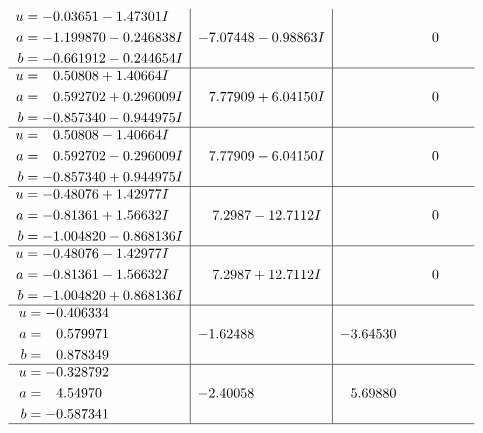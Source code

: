 \documentclass[1p]{elsarticle_modified}
\theoremstyle{definition}
\begin{document}
$$\begin{array}{c|c|c}
\begin{aligned}
u &= -0.03651 - 1.47301 I \\
a &= -1.199870 - 0.246838 I \\
b &= -0.661912 - 0.244654 I\end{aligned}
 & -7.07448 - 0.98863 I & \phantom{-0.000000 } 0 \\ \hline\begin{aligned}
u &= \phantom{-}0.50808 + 1.40664 I \\
a &= \phantom{-}0.592702 + 0.296009 I \\
b &= -0.857340 - 0.944975 I\end{aligned}
 & \phantom{-}7.77909 + 6.04150 I & \phantom{-0.000000 } 0 \\ \hline\begin{aligned}
u &= \phantom{-}0.50808 - 1.40664 I \\
a &= \phantom{-}0.592702 - 0.296009 I \\
b &= -0.857340 + 0.944975 I\end{aligned}
 & \phantom{-}7.77909 - 6.04150 I & \phantom{-0.000000 } 0 \\ \hline\begin{aligned}
u &= -0.48076 + 1.42977 I \\
a &= -0.81361 + 1.56632 I \\
b &= -1.004820 - 0.868136 I\end{aligned}
 & \phantom{-}7.2987 - 12.7112 I & \phantom{-0.000000 } 0 \\ \hline\begin{aligned}
u &= -0.48076 - 1.42977 I \\
a &= -0.81361 - 1.56632 I \\
b &= -1.004820 + 0.868136 I\end{aligned}
 & \phantom{-}7.2987 + 12.7112 I & \phantom{-0.000000 } 0 \\ \hline\begin{aligned}
u &= -0.406334\phantom{ +0.000000I} \\
a &= \phantom{-}0.579971\phantom{ +0.000000I} \\
b &= \phantom{-}0.878349\phantom{ +0.000000I}\end{aligned}
 & -1.62488\phantom{ +0.000000I} & -3.64530\phantom{ +0.000000I} \\ \hline\begin{aligned}
u &= -0.328792\phantom{ +0.000000I} \\
a &= \phantom{-}4.54970\phantom{ +0.000000I} \\
b &= -0.587341\phantom{ +0.000000I}\end{aligned}
 & -2.40058\phantom{ +0.000000I} & \phantom{-}5.69880\phantom{ +0.000000I}\\
 \hline 
 \end{array}$$\newpage\newpage\renewcommand{\arraystretch}{1}
\end{document}
